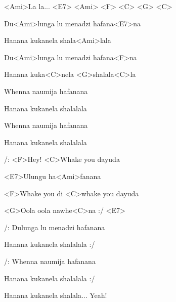 

\zr

<Ami>La la... <E7> <Ami> <F> <C> <G> <C>
\kr

\zs
Du<Ami>lunga lu menadzi hafana<E7>na

Hanana kukanela shala<Ami>lala

Du<Ami>lunga lu menadzi hafana<F>na

Hanana kuka<C>nela <G>shalala<C>la
\ks


\zs
Whenna naumija hafanana

Hanana kukanela shalalala

Whenna naumija hafanana

Hanana kukanela shalalala
\ks

\zs
/: <F>Hey! <C>Whake you dayuda

<E7>Ulungu ha<Ami>fanana

<F>Whake you di <C>whake you dayuda

<G>Oola oola nawhe<C>na :/ <E7>
\ks

\zr \kr

\zs
/: Dulunga lu menadzi hafanana

Hanana kukanela shalalala :/

/: Whenna naumija hafanana

Hanana kukanela shalalala :/
\ks

\zr \kr


Hanana kukanela shalala... Yeah!

\kp



